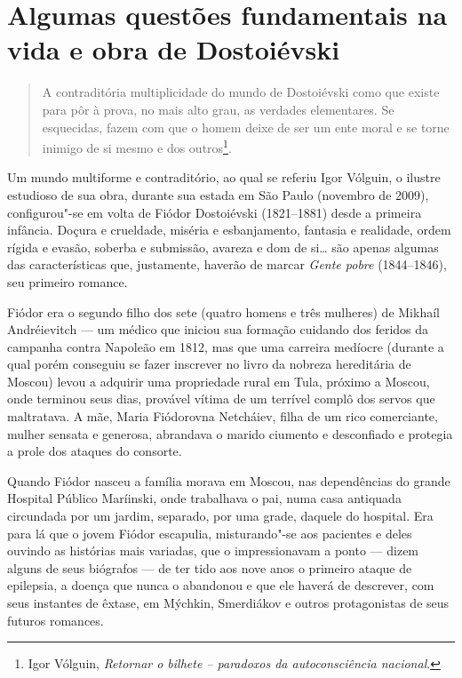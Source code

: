 \chapter{Algumas questões fundamentais na vida e obra de Dostoiévski}

\begin{quote}
A contraditória multiplicidade do mundo de Dostoiévski como
que existe para pôr à prova, no mais alto grau, as verdades elementares.
Se esquecidas, fazem com que o homem deixe de ser um ente moral e se
torne inimigo de si mesmo e dos outros\footnote{Igor Vólguin, \emph{Retornar o bilhete -- paradoxos da autoconsciência
nacional}.}.
\end{quote}


Um mundo multiforme e contraditório, ao qual se referiu Igor Vólguin,
o ilustre estudioso de sua obra, durante sua estada em São Paulo
(novembro de 2009), configurou"-se em volta de Fiódor Dostoiévski
(1821--1881) desde a primeira infância. Doçura e crueldade, miséria e
esbanjamento, fantasia e realidade, ordem rígida e evasão, soberba e
submissão, avareza e dom de si\ldots{} são apenas algumas das características
que, justamente, haverão de marcar \emph{Gente pobre} (1844--1846), seu
primeiro romance.

Fiódor era o segundo filho dos sete (quatro homens e três mulheres) de
Mikhaíl Andréievitch --- um médico que iniciou sua formação cuidando dos
feridos da campanha contra Napoleão em 1812, mas que uma carreira
medíocre (durante a qual porém conseguiu se fazer inscrever no livro da
nobreza hereditária de Moscou) levou a adquirir uma propriedade rural em
Tula, próximo a Moscou, onde terminou seus dias, provável vítima de um terrível
complô dos servos que maltratava. A mãe, Maria Fiódorovna Netcháiev,
filha de um rico comerciante, mulher sensata e generosa, abrandava o
marido ciumento e desconfiado e protegia a prole dos ataques do
consorte.

Quando Fiódor nasceu a família morava em Moscou, nas dependências do
grande Hospital Público Maríinski, onde trabalhava o pai, numa casa
antiquada circundada por um jardim, separado, por uma grade, daquele do
hospital. Era para lá que o jovem Fiódor escapulia, misturando"-se aos
pacientes e deles ouvindo as histórias mais variadas, que o
impressionavam a ponto --- dizem alguns de seus biógrafos --- de ter tido
aos nove anos o primeiro ataque de epilepsia, a doença que nunca o
abandonou e que ele haverá de descrever, com seus instantes de êxtase,
em Mýchkin, Smerdiákov e outros protagonistas de seus futuros romances.


